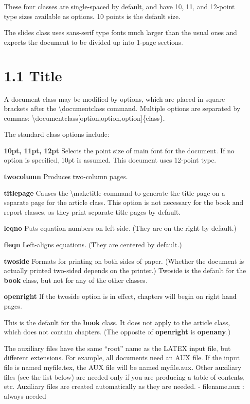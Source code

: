\documentclass[12pt,openright]{book}
\begin{document}
These four classes are single-spaced by default, and have 10, 11, and 12-point type sizes available as options. 10 points is the default size.

The slides class uses sans-serif type fonts much larger than the usual ones and expects the document to be divided up into 1-page sections.

\section{1.1 Title}

A document class may be modified by options, which are placed in square brackets after the \textbackslash documentclass command. Multiple options are separated by commas: \textbackslash documentclass[option,option,option]\{class\}.

The standard class options include:

\textbf{10pt, 11pt, 12pt} Selects the point size of main font for the document. If no option is specified, 10pt is assumed. This document uses 12-point type.

\textbf{twocolumn} Produces two-column pages.

\textbf{titlepage} Causes the \textbackslash maketitle command to generate the title page on a separate page for the article class. This option is not necessary for the book and report classes, as they print separate title pages by default.

\textbf{leqno} Puts equation numbers on left side. (They are on the right by default.)

\textbf{fleqn} Left-aligns equations. (They are centered by default.)

\textbf{twoside} Formats for printing on both sides of paper. (Whether the document is actually printed two-sided depends on the printer.) Twoside is the default for the \textbf{book} class, but not for any of the other classes.

\textbf{openright} If the twoside option is in effect, chapters will begin on right hand pages.

This is the default for the \textbf{book} class. It does not apply to the article class, which does not contain chapters. (The opposite of \textbf{openright} is \textbf{openany}.)

\vskip 0.1in
The auxiliary files have the same “root” name as the LATEX input file, but different
extensions. For example, all documents need an AUX file. If the input file is named
myfile.tex, the AUX file will be named myfile.aux. Other auxiliary files (see the list
below) are needed only if you are producing a table of contents, etc. Auxiliary files are
created automatically as they are needed.
\vskip 0.1in
- filename.aux : always needed
\end{document}
